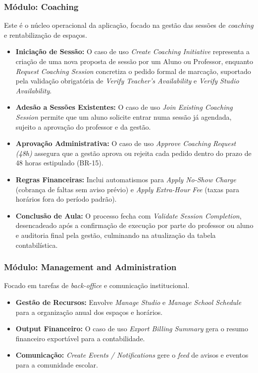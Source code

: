 \documentclass[12pt,a4paper]{report}
\begin{document}
\subsubsection{Módulo: Coaching}
Este é o núcleo operacional da aplicação, focado na gestão das sessões de \textit{coaching} e rentabilização de espaços.
\begin{itemize}
    \item \textbf{Iniciação de Sessão:} O caso de uso \textit{Create Coaching Initiative} representa a criação de uma nova proposta de sessão por um Aluno ou Professor, enquanto \textit{Request Coaching Session} concretiza o pedido formal de marcação, suportado pela validação obrigatória de \textit{Verify Teacher's Availability} e \textit{Verify Studio Availability}.
    \item \textbf{Adesão a Sessões Existentes:} O caso de uso \textit{Join Existing Coaching Session} permite que um aluno solicite entrar numa sessão já agendada, sujeito a aprovação do professor e da gestão.
    \item \textbf{Aprovação Administrativa:} O caso de uso \textit{Approve Coaching Request (48h)} assegura que a gestão aprova ou rejeita cada pedido dentro do prazo de 48 horas estipulado (BR-15).
    \item \textbf{Regras Financeiras:} Inclui automatismos para \textit{Apply No-Show Charge} (cobrança de faltas sem aviso prévio) e \textit{Apply Extra-Hour Fee} (taxas para horários fora do período padrão).
    \item \textbf{Conclusão de Aula:} O processo fecha com \textit{Validate Session Completion}, desencadeado após a confirmação de execução por parte do professor ou aluno e auditoria final pela gestão, culminando na atualização da tabela contabilística.
\end{itemize}

\subsubsection{Módulo: Management and Administration}
Focado em tarefas de \textit{back-office} e comunicação institucional.
\begin{itemize}
    \item \textbf{Gestão de Recursos:} Envolve \textit{Manage Studio} e \textit{Manage School Schedule} para a organização anual dos espaços e horários.
    \item \textbf{Output Financeiro:} O caso de uso \textit{Export Billing Summary} gera o resumo financeiro exportável para a contabilidade.
    \item \textbf{Comunicação:} \textit{Create Events / Notifications} gere o \textit{feed} de avisos e eventos para a comunidade escolar.
\end{itemize}
\end{document}

